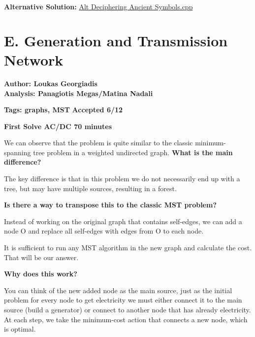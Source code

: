 \documentclass{article}
\begin{document}
\vspace{1em}
\noindent \textbf{Alternative Solution:} 
\href{https://github.com/StathisKons/GRCPC-2024-Editorial-Implementations/blob/main/Sample%20Implementations/D.%20Alt%20Sol%20Deciphering%20Ancient%20Symbols.cpp}{Alt Deciphering Ancient Symbols.cpp}

\newpage

\vspace{5em}

\section*{E. Generation and Transmission Network}

\textbf{Author: Loukas Georgiadis}\\
\textbf{Analysis: Panagiotis Megas/Matina Nadali}

\vspace{2em}
\noindent \textbf{Tags: graphs, MST} 
\hfill \textbf{Accepted 6/12}

\hfill \textbf{First Solve AC/DC 70 minutes}

\vspace{2em}

\noindent We can observe that the problem is quite similar to the classic minimum-spanning tree problem in a weighted undirected graph.  \textbf{What is the main difference?}

\noindent The key difference is that in this problem we do not necessarily end up with a tree, but may have multiple sources, resulting in a forest. 

\vspace{1em}

\noindent \textbf{Is there a way to transpose this to the classic MST problem?}

\noindent Instead of working on the original graph that contains self-edges, we can add a node O and replace all self-edges with edges from O to each node. 

\vspace{1em}
\noindent It is sufficient to run any MST algorithm in the new graph and calculate the cost. That will be our answer. 

\vspace{1em}
\noindent \textbf{Why does this work?}

\noindent You can think of the new added node as the main source, just as the initial problem for every node to get electricity  we must either connect it to the main source (build a generator) or connect to another node that has already electricity. At each step, we take the minimum-cost action that connects a new node, which is optimal.
\end{document}
